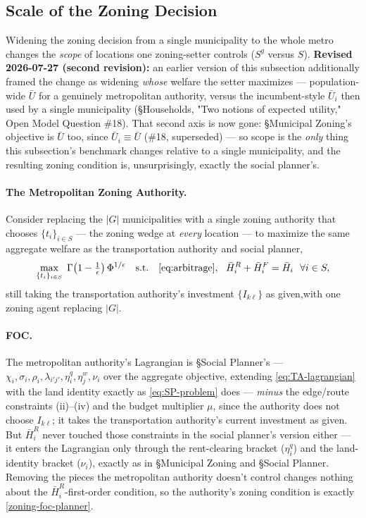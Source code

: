 \documentclass[12pt, a4paper]{article}
\theoremstyle{definition}
\theoremstyle{remark}
\begin{document}
\subsection{Scale of the Zoning Decision}

Widening the zoning decision from a single municipality to the whole metro changes the \emph{scope} of locations one zoning-setter controls ($S^g$ versus $S$). \textbf{Revised 2026-07-27 (second revision):} an earlier version of this subsection additionally framed the change as widening \emph{whose} welfare the setter maximizes — population-wide $\bar U$ for a genuinely metropolitan authority, versus the incumbent-style $\bar U_i$ then used by a single municipality (\S Households, "Two notions of expected utility," Open Model Question \#18). That second axis is now gone: \S Municipal Zoning's objective is $\bar U$ too, since $\bar U_i\equiv\bar U$ (\#18, superseded) — so scope is the \emph{only} thing this subsection's benchmark changes relative to a single municipality, and the resulting zoning condition is, unsurprisingly, exactly the social planner's.

\paragraph{The Metropolitan Zoning Authority.} Consider replacing the $|G|$ municipalities with a single zoning authority that chooses $\{t_i\}_{i \in S}$ — the zoning wedge at \emph{every} location — to maximize the same aggregate welfare as the transportation authority and social planner,
\[
\max_{\{t_i\}_{i\in S}}\; \Gamma\!\left(1-\tfrac1\epsilon\right)\Phi^{1/\epsilon}
\quad\text{s.t.}\quad
\eqref{eq:arbitrage},\ \ \bar H_i^R+\bar H_i^F=\bar H_i \ \ \forall i\in S,
\]
still taking the transportation authority's investment $\{I_{k\ell}\}$ as given,with one zoning agent replacing $|G|$.

\paragraph{FOC.} The metropolitan authority's Lagrangian is \S Social Planner's — $\chi_i,\sigma_i,\rho_i,\lambda_{i'j'},\eta_i^q,\eta_j^w,\nu_i$ over the aggregate objective, extending \eqref{eq:TA-lagrangian} with the land identity exactly as \eqref{eq:SP-problem} does — \emph{minus} the edge/route constraints (ii)–(iv) and the budget multiplier $\mu$, since the authority does not choose $I_{k\ell}$; it takes the transportation authority's current investment as given. But $\bar H_i^R$ never touched those constraints in the social planner's version either — it enters the Lagrangian only through the rent-clearing bracket ($\eta_i^q$) and the land-identity bracket ($\nu_i$), exactly as in \S Municipal Zoning and \S Social Planner. Removing the pieces the metropolitan authority doesn't control changes nothing about the $\bar H_i^R$-first-order condition, so the authority's zoning condition is exactly \eqref{zoning-foc-planner}.
\end{document}
